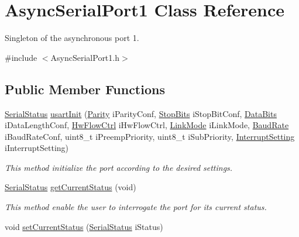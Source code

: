 \hypertarget{class_async_serial_port1}{\section{\-Async\-Serial\-Port1 \-Class \-Reference}
\label{class_async_serial_port1}
}


\-Singleton of the asynchronous port 1.  




{\ttfamily \#include $<$\-Async\-Serial\-Port1.\-h$>$}

\subsection*{\-Public \-Member \-Functions}
\begin{DoxyCompactItemize}
\item 
\hyperlink{_serial_type_8h_a71c113451bfafdaf5fcabcd807acd480}{\-Serial\-Status} \hyperlink{class_async_serial_port1_a3f62abb242f09bb35524d31996c88320}{usart\-Init} (\hyperlink{_serial_type_8h_ac47b2bd906d2c843b97ecae6c1eea710}{\-Parity} i\-Parity\-Conf, \hyperlink{_serial_type_8h_a2e4c31ec0a94db405865b7c241717fbe}{\-Stop\-Bits} i\-Stop\-Bit\-Conf, \hyperlink{_serial_type_8h_a11275f46707b20c44d7b07eb6ca04baf}{\-Data\-Bits} i\-Data\-Length\-Conf, \hyperlink{_serial_type_8h_a0ed0ee4a49d7dcf4109ba39a3ca1a8b7}{\-Hw\-Flow\-Ctrl} i\-Hw\-Flow\-Ctrl, \hyperlink{_serial_type_8h_a30da35a35e2d0882c738f6f991905df7}{\-Link\-Mode} i\-Link\-Mode, \hyperlink{_serial_type_8h_a7654bd82719bfde1c792d7828664dde2}{\-Baud\-Rate} i\-Baud\-Rate\-Conf, uint8\-\_\-t i\-Preemp\-Priority, uint8\-\_\-t i\-Sub\-Priority, \hyperlink{_serial_type_8h_ad8005790f3b92862aa09c52f14f58e24}{\-Interrupt\-Setting} i\-Interrupt\-Setting)
\begin{DoxyCompactList}\small\item\em \-This method initialize the port according to the desired settings. \end{DoxyCompactList}\item 
\hyperlink{_serial_type_8h_a71c113451bfafdaf5fcabcd807acd480}{\-Serial\-Status} \hyperlink{class_async_serial_port1_ae5c7825b0eb62d17f937e1db43bd72ab}{get\-Current\-Status} (void)
\begin{DoxyCompactList}\small\item\em \-This method enable the user to interrogate the port for its current status. \end{DoxyCompactList}\item 
\hypertarget{class_async_serial_port1_ad62d4d10e37dc483addf7df23f3cd4dc}{void \hyperlink{class_async_serial_port1_ad62d4d10e37dc483addf7df23f3cd4dc}{set\-Current\-Status} (\hyperlink{_serial_type_8h_a71c113451bfafdaf5fcabcd807acd480}{\-Serial\-Status} i\-Status)}\label{class_async_serial_port1_ad62d4d10e37dc483addf7df23f3cd4dc}


\end{DoxyCompactItemize}
